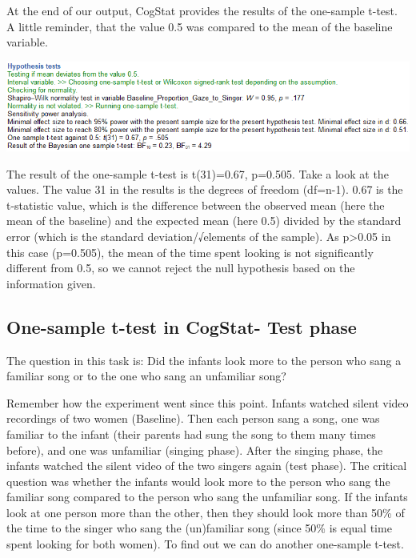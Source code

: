 \documentclass[
]{book}
\begin{document}
At the end of our output, CogStat provides the results of the one-sample t-test. A little reminder, that the value 0.5 was compared to the mean of the baseline variable.

\includegraphics{img/ch6/6.4hyptest.png}

The result of the one-sample t-test is t(31)=0.67, p=0.505. Take a look at the values. The value 31 in the results is the degrees of freedom (df=n-1). 0.67 is the t-statistic value, which is the difference between the observed mean (here the mean of the baseline) and the expected mean (here 0.5) divided by the standard error (which is the standard deviation/√elements of the sample). As p\textgreater0.05 in this case (p=0.505), the mean of the time spent looking is not significantly different from 0.5, so we cannot reject the null hypothesis based on the information given.

\hypertarget{one-sample-t-test-in-cogstat--test-phase}{%
\subsection{One-sample t-test in CogStat- Test phase}\label{one-sample-t-test-in-cogstat--test-phase}}

The question in this task is: Did the infants look more to the person who sang a familiar song or to the one who sang an unfamiliar song?

Remember how the experiment went since this point. Infants watched silent video recordings of two women (Baseline). Then each person sang a song, one was familiar to the infant (their parents had sung the song to them many times before), and one was unfamiliar (singing phase). After the singing phase, the infants watched the silent video of the two singers again (test phase). The critical question was whether the infants would look more to the person who sang the familiar song compared to the person who sang the unfamiliar song. If the infants look at one person more than the other, then they should look more than 50\% of the time to the singer who sang the (un)familiar song (since 50\% is equal time spent looking for both women). To find out we can do another one-sample t-test.
\end{document}

